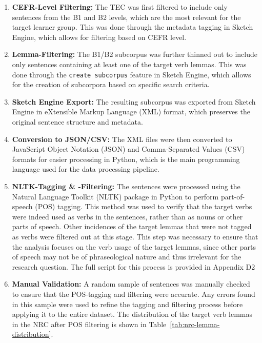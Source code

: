 \documentclass[11pt,a4paper]{article}
\begin{document}
\begin{enumerate}
    \item \textbf{CEFR-Level Filtering:} The TEC was first filtered to include only sentences from the B1 and B2 levels, which are the most relevant for the target learner group. This was done through the metadata tagging in Sketch Engine, which allows for filtering based on CEFR level.
    \item \textbf{Lemma-Filtering:} The B1/B2 subcorpus was further thinned out to include only sentences containing at least one of the target verb lemmas. This was done through the \texttt{create subcorpus} feature in Sketch Engine, which allows for the creation of subcorpora based on specific search criteria.
    \item \textbf{Sketch Engine Export:} The resulting subcorpus was exported from Sketch Engine in eXtensible Markup Language (XML) format, which preserves the original sentence structure and metadata.
    \item \textbf{Conversion to JSON/CSV:} The XML files were then converted to JavaScript Object Notation (JSON) and Comma-Separated Values (CSV) formats for easier processing in Python, which is the main programming language used for the data processing pipeline.
    \item \textbf{NLTK-Tagging \& -Filtering:} The sentences were processed using the Natural Language Toolkit (NLTK) package in Python to perform part-of-speech (POS) tagging. This method was used to verify that the target verbs were indeed used as verbs in the sentences, rather than as nouns or other parts of speech. Other incidences of the target lemmas that were not tagged as verbs were filtered out at this stage. This step was necessary to ensure that the analysis focuses on the verb usage of the target lemmas, since other parts of speech may not be of phraseological nature and thus irrelevant for the research question.  The full script for this process is provided in Appendix D2
    \item \textbf{Manual Validation:} A random sample of sentences was manually checked to ensure that the POS-tagging and filtering were accurate. Any errors found in this sample were used to refine the tagging and filtering process before applying it to the entire dataset. The distribution of the target verb lemmas in the NRC after POS filtering is shown in Table~\ref{tab:nrc-lemma-distribution}.
\end{enumerate}

\vspace{1em}
\end{document}
